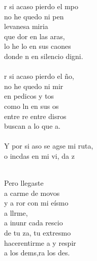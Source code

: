 \begin{cancion}%
	r si acaso pierdo el mpo \\
	no he quedo ni pen \\
	levanesa miria \\
	que dor en las aras, \\
	lo he lo en sus caones \\
	donde n en silencio digni. \\
\jump\\
	r si acaso pierdo el ño, \\
	no he quedo ni mir\\
	en pedicos y tos\\
	como ln en sus os \\
	entre re entre disros\\
	buscan  a lo que a. \\
\jump\\
	Y por si aso se agse mi ruta,\\
	o incdas en mi vi, da z\\\jump\\
	\begin{chorus}%
	Pero llegaste   \\
	a carme de movos\\
	y a ror con mi eísmo\\
	a llrme, \\
	a inunr cada rescio\\
	de tu za, tu extresmo \\
	hacerentirme a y respir \\
	a los dems,ra los des. \\
	\end{chorus}%

\end{cancion}
